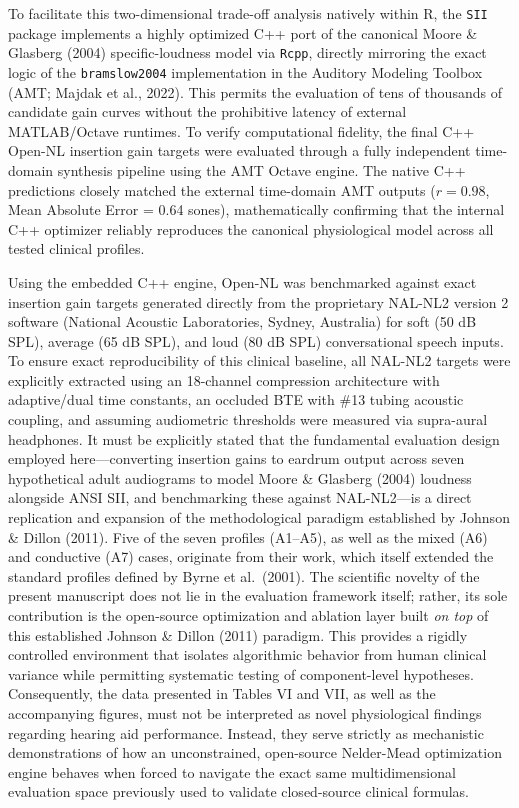 \documentclass[
  12pt,
]{article}
\begin{document}
To facilitate this two-dimensional trade-off analysis natively within R,
the \texttt{SII} package implements a highly optimized C++ port of the
canonical Moore \& Glasberg (2004) specific-loudness model via
\texttt{Rcpp}, directly mirroring the exact logic of the
\texttt{bramslow2004} implementation in the Auditory Modeling Toolbox
(AMT; Majdak et al., 2022). This permits the evaluation of tens of
thousands of candidate gain curves without the prohibitive latency of
external MATLAB/Octave runtimes. To verify computational fidelity, the
final C++ Open-NL insertion gain targets were evaluated through a fully
independent time-domain synthesis pipeline using the AMT Octave engine.
The native C++ predictions closely matched the external time-domain AMT
outputs (\(r = 0.98\), Mean Absolute Error = 0.64 sones), mathematically
confirming that the internal C++ optimizer reliably reproduces the
canonical physiological model across all tested clinical profiles.

Using the embedded C++ engine, Open-NL was benchmarked against exact
insertion gain targets generated directly from the proprietary NAL-NL2
version 2 software (National Acoustic Laboratories, Sydney, Australia)
for soft (50 dB SPL), average (65 dB SPL), and loud (80 dB SPL)
conversational speech inputs. To ensure exact reproducibility of this
clinical baseline, all NAL-NL2 targets were explicitly extracted using
an 18-channel compression architecture with adaptive/dual time
constants, an occluded BTE with \#13 tubing acoustic coupling, and
assuming audiometric thresholds were measured via supra-aural
headphones. It must be explicitly stated that the fundamental evaluation
design employed here---converting insertion gains to eardrum output
across seven hypothetical adult audiograms to model Moore \& Glasberg
(2004) loudness alongside ANSI SII, and benchmarking these against
NAL-NL2---is a direct replication and expansion of the methodological
paradigm established by Johnson \& Dillon (2011). Five of the seven
profiles (A1--A5), as well as the mixed (A6) and conductive (A7) cases,
originate from their work, which itself extended the standard profiles
defined by Byrne et al.~(2001). The scientific novelty of the present
manuscript does not lie in the evaluation framework itself; rather, its
sole contribution is the open-source optimization and ablation layer
built \emph{on top} of this established Johnson \& Dillon (2011)
paradigm. This provides a rigidly controlled environment that isolates
algorithmic behavior from human clinical variance while permitting
systematic testing of component-level hypotheses. Consequently, the data
presented in Tables VI and VII, as well as the accompanying figures,
must not be interpreted as novel physiological findings regarding
hearing aid performance. Instead, they serve strictly as mechanistic
demonstrations of how an unconstrained, open-source Nelder-Mead
optimization engine behaves when forced to navigate the exact same
multidimensional evaluation space previously used to validate
closed-source clinical formulas.
\end{document}
